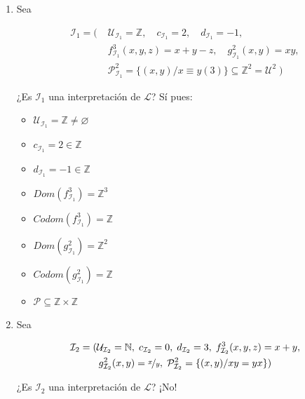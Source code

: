 \begin{enumerate}
    \item Sea 

    \begin{align*}
        \mathcal{I}_1 = (\;
        &\mathcal{U}_{\mathcal{I}_1} = \mathbb{Z}, \quad
        c_{\mathcal{I}_1} = 2, \quad
        d_{\mathcal{I}_1} = -1, \\
        &f_{\mathcal{I}_1}^3 (x,y,z) = x+y-z, \quad
        g_{\mathcal{I}_1}^2 (x,y) = xy, \\
        & \mathcal{P}_{\mathcal{I}_1}^2 = \{ (x,y)/ x \equiv y (3) \}
        \subseteq \mathbb{Z}^{2} = \mathcal{U}^{2}
        \;)
    \end{align*}

    \medskip

    ¿Es $\mathcal{I}_1$ una interpretación de $\mathcal{L}$? Sí pues:

    \begin{itemize}[label=\cmark]
        \item $\mathcal{U}_{\mathcal{I}_1} = \mathbb{Z} \neq \varnothing$
        \item  $c_{\mathcal{I}_1} = 2 \in \mathbb{Z}$
        \item  $d_{\mathcal{I}_1} = -1 \in \mathbb{Z}$
        \item  $Dom(f_{\mathcal{I}_1}^3) = \mathbb{Z}^3$
        \item  $Codom(f_{\mathcal{I}_1}^3) = \mathbb{Z}$
        \item  $Dom(g_{\mathcal{I}_1}^2) = \mathbb{Z}^2$
        \item  $Codom(g_{\mathcal{I}_1}^2) = \mathbb{Z}$
        \item  $\mathcal{P} \subseteq \mathbb{Z} \times \mathbb{Z}$
    \end{itemize}

    \item Sea 

        \begin{gather*}
        \mathcal{I}_2 = (\mathcal{U}_{\mathcal{I}_2} = \mathbb{N}, \;
        c_{\mathcal{I}_2} = 0, \;
        d_{\mathcal{I}_2} = 3, \;
        f_{\mathcal{I}_2}^3 (x,y,z) = x+y, \\
        g_{\mathcal{I}_2}^2 (x,y) = \nicefrac{x}{y}, \;
        \mathcal{P}_{\mathcal{I}_2}^2 = \{ (x,y)/ xy=yx \}
        ) 
    \end{gather*}

    \medskip

    ¿Es $\mathcal{I}_2$ una interpretación de $\mathcal{L}$? ¡No!


\end{enumerate}
